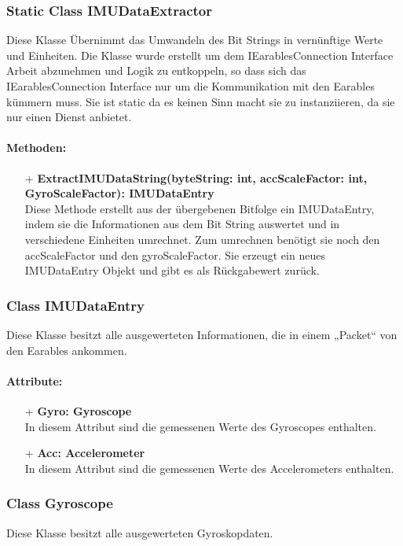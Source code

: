 \documentclass[a4paper,12pt]{article}
\begin{document}
\subsubsection{Static Class IMUDataExtractor}
Diese Klasse Übernimmt das Umwandeln des Bit Strings in vernünftige Werte und Einheiten.
Die Klasse wurde erstellt um dem IEarablesConnection Interface Arbeit abzunehmen und Logik zu entkoppeln, so dass sich das IEarablesConnection
Interface nur um die Kommunikation mit den \Gls{Earables} kümmern muss. Sie ist static da es keinen Sinn macht sie zu instanziieren, da sie nur einen Dienst anbietet.

\paragraph{Methoden:}
\begin{itemize}
	\item[+] \textbf{ExtractIMUDataString(byteString: int, accScaleFactor: int, GyroScaleFactor): IMUDataEntry}\\Diese Methode erstellt aus der übergebenen Bitfolge ein IMUDataEntry, indem sie die Informationen aus dem Bit String auswertet und in verschiedene Einheiten umrechnet. Zum umrechnen benötigt sie noch den accScaleFactor und den gyroScaleFactor. Sie erzeugt ein neues IMUDataEntry Objekt und gibt es als Rückgabewert zurück.
\end{itemize}


\subsubsection{Class IMUDataEntry}
Diese Klasse besitzt alle ausgewerteten Informationen, die in einem „Packet“ von den \Gls{Earables} ankommen.

\paragraph{Attribute:}
\begin{itemize}
	\item[+] \textbf{Gyro: Gyroscope}\\In diesem Attribut sind die gemessenen Werte des Gyroscopes enthalten.
	\item[+] \textbf{Acc: Accelerometer}\\In diesem Attribut sind die gemessenen Werte des Accelerometers enthalten.
\end{itemize}


\subsubsection{Class Gyroscope}
Diese Klasse besitzt alle ausgewerteten Gyroskopdaten.
\end{document}
